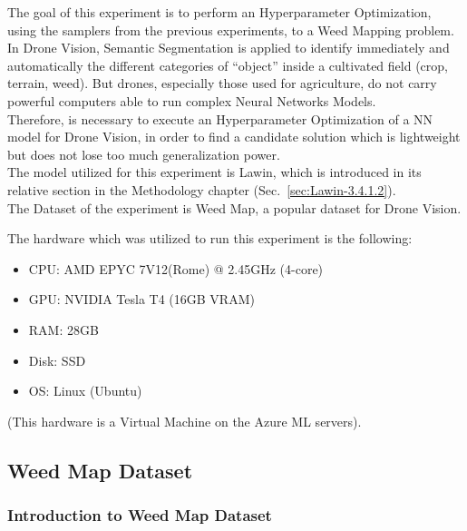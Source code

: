 The goal of this experiment is to perform an Hyperparameter Optimization, using the samplers from the previous experiments, to a Weed Mapping problem.
\\[0.3cm]In Drone Vision, Semantic Segmentation is applied to identify immediately and automatically the different categories of “object” inside a cultivated field (crop, terrain, weed). But drones, especially those used for agriculture, do not carry powerful computers able to run complex Neural Networks Models.
\\[0.3cm]Therefore, is necessary to execute an Hyperparameter Optimization of a NN model for Drone Vision, in order to find a candidate solution which is lightweight but does not lose too much generalization power.
\\[0.3cm]The model utilized for this experiment is Lawin, which is introduced in its relative section in the Methodology chapter (Sec.~\ref{sec:Lawin-3.4.1.2}).
\\[0.3cm]The Dataset of the experiment is Weed Map, a popular dataset for Drone Vision.

The hardware which was utilized to run this experiment is the following:
\begin{itemize}[itemsep=0.1cm]
	\item CPU: AMD EPYC 7V12(Rome) @ 2.45GHz (4-core)
	\item GPU: NVIDIA Tesla T4 (16GB VRAM)
	\item RAM: 28GB
	\item Disk: SSD
	\item OS: Linux (Ubuntu)
\end{itemize}
(This hardware is a Virtual Machine on the Azure ML servers).

\subsection{Weed Map Dataset}

\subsubsection{Introduction to Weed Map Dataset}

